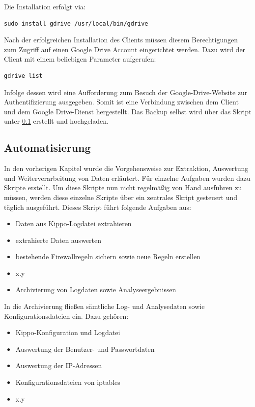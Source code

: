 Die Installation erfolgt via:

\begin{lstlisting}[style=customc]
sudo install gdrive /usr/local/bin/gdrive
\end{lstlisting}

Nach der erfolgreichen Installation des Clients müssen diesem Berechtigungen zum Zugriff auf einen Google Drive Account eingerichtet werden. Dazu wird der Client mit einem beliebigen Parameter aufgerufen:

\begin{lstlisting}[style=customc]
gdrive list
\end{lstlisting}

Infolge dessen wird eine Aufforderung zum Besuch der Google-Drive-Website zur Authentifizierung ausgegeben. Somit ist eine Verbindung zwischen dem Client und dem Google Drive-Dienst hergestellt. Das Backup selbst wird über das Skript unter \ref{subsec:Automatisierung} erstellt und hochgeladen.


\subsection{Automatisierung}
\label{subsec:Automatisierung}

In den vorherigen Kapitel wurde die Vorgehensweise zur Extraktion, Auswertung und Weiterverarbeitung von Daten erläutert. Für einzelne Aufgaben wurden dazu Skripte erstellt. Um diese Skripte nun nicht regelmäßig von Hand ausführen zu müssen, werden diese einzelne Skripte über ein zentrales Skript gesteuert und täglich ausgeführt. Dieses Skript führt folgende Aufgaben aus:

\begin{itemize}
\item Daten aus Kippo-Logdatei extrahieren
\item extrahierte Daten auswerten
\item bestehende Firewallregeln sichern sowie neue Regeln erstellen
\item x.y
\item Archivierung von Logdaten sowie Analyseergebnissen
\end{itemize}

In die Archivierung fließen sämtliche Log- und Analysedaten sowie Konfigurationsdateien ein. Dazu gehören:

\begin{itemize}
\item Kippo-Konfiguration und Logdatei
\item Auswertung der Benutzer- und Passwortdaten
\item Auswertung der IP-Adressen
\item Konfigurationsdateien von iptables
\item x.y
\end{itemize}

